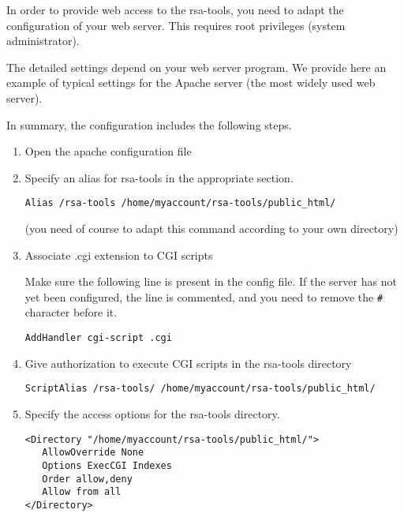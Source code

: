 \documentclass{article}
\begin{document}
In order to provide web access to the rsa-tools, you need to adapt the
configuration of your web server. This requires root privileges
(system administrator). 


The detailed settings depend on your web server program. We provide
here an example of typical settings for the Apache server (the most
widely used web server).

In summary, the configuration includes the following steps.

\begin{enumerate}
\item Open the apache configuration file 

\item Specify an alias for rsa-tools in the appropriate section.

\begin{verbatim}
Alias /rsa-tools /home/myaccount/rsa-tools/public_html/
\end{verbatim}

  (you need of course to adapt this command according to your own
  \RSAT directory)

\item Associate .cgi extension to CGI scripts

Make sure the following line is present in the config file. If the
server has not yet been configured, the line is commented, and you
need to remove the \texttt{\#} character before it.

\begin{verbatim}
AddHandler cgi-script .cgi
\end{verbatim}

\item Give authorization to execute CGI scripts in the rsa-tools directory

\begin{verbatim}
ScriptAlias /rsa-tools/ /home/myaccount/rsa-tools/public_html/
\end{verbatim}

\item Specify the access options for the rsa-tools directory.

\begin{verbatim}
<Directory "/home/myaccount/rsa-tools/public_html/">
   AllowOverride None
   Options ExecCGI Indexes
   Order allow,deny
   Allow from all
</Directory>
\end{verbatim}

\end{enumerate}
\end{document}
